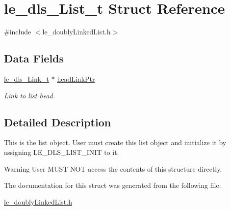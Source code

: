 \hypertarget{structle__dls___list__t}{}\section{le\+\_\+dls\+\_\+\+List\+\_\+t Struct Reference}
\label{structle__dls___list__t}


{\ttfamily \#include $<$le\+\_\+doubly\+Linked\+List.\+h$>$}

\subsection*{Data Fields}
\begin{DoxyCompactItemize}
\item 
\hyperlink{structle__dls___link__t}{le\+\_\+dls\+\_\+\+Link\+\_\+t} $\ast$ \hyperlink{structle__dls___list__t_a830f3082336d0b79e10e6206e2428dda}{head\+Link\+Ptr}\hypertarget{structle__dls___list__t_a830f3082336d0b79e10e6206e2428dda}{}\label{structle__dls___list__t_a830f3082336d0b79e10e6206e2428dda}

\begin{DoxyCompactList}\small\item\em Link to list head. \end{DoxyCompactList}\end{DoxyCompactItemize}


\subsection{Detailed Description}
This is the list object. User must create this list object and initialize it by assigning L\+E\+\_\+\+D\+L\+S\+\_\+\+L\+I\+S\+T\+\_\+\+I\+N\+IT to it.

\begin{DoxyWarning}{Warning}
User M\+U\+ST N\+OT access the contents of this structure directly. 
\end{DoxyWarning}


The documentation for this struct was generated from the following file\+:\begin{DoxyCompactItemize}
\item 
\hyperlink{le__doubly_linked_list_8h}{le\+\_\+doubly\+Linked\+List.\+h}\end{DoxyCompactItemize}
